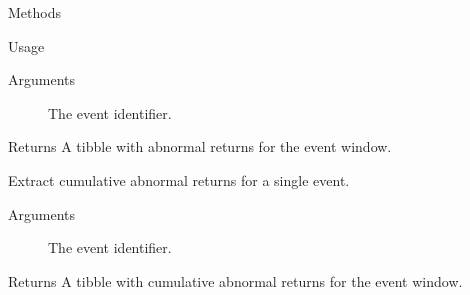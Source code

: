 \documentclass[a4paper]{book}
\begin{document}
\begin{Section}{Methods}
\begin{SubSection}{}
\begin{SubSubSection}{Usage}
\end{SubSubSection}

%
\begin{SubSubSection}{Arguments}

\begin{description}

\item[] The event identifier.

\end{description}



\end{SubSubSection}

%
\begin{SubSubSection}{Returns}
A tibble with abnormal returns for the event window.

\end{SubSubSection}

\end{SubSection}




\hypertarget{method-EventStudyTask-get_car}{}
%
\begin{SubSection}{}
Extract cumulative abnormal returns for a single event.
%

%
\begin{SubSubSection}{Arguments}

\begin{description}

\item[] The event identifier.

\end{description}



\end{SubSubSection}

%
\begin{SubSubSection}{Returns}
A tibble with cumulative abnormal returns for the event window.

\end{SubSubSection}

\end{SubSection}





\end{Section}
\end{document}
